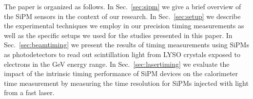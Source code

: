 The paper is organized as follows. In Sec.~\ref{sec:sipm} we give a brief
overview of the SiPM sensors in the context of our research. In
Sec.~\ref{sec:setup} we describe the experimental techniques we employ in our
precision timing measurements as well as the specific setups we used for the
studies presented in this paper. In Sec.~\ref{sec:beamtiming} we present the
results of timing measurements using SiPMs as photodetectors to read out
scintillation light from LYSO crystals exposed to electrons in the GeV energy
range. In Sec.~\ref{sec:lasertiming} we evaluate the impact of the intrinsic
timing performance of SiPM devices on the calorimeter time measurement by
measuring the time resolution for SiPMs injected with light from a fast laser.
